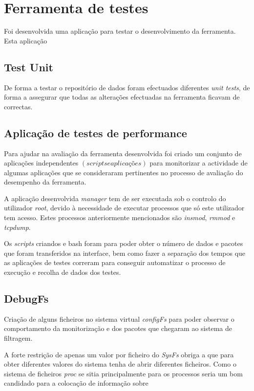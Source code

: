 \section{Ferramenta de testes}

Foi desenvolvida uma aplicação para testar o desenvolvimento da ferramenta.
Esta aplicação 

\subsection{Test Unit}

De forma a testar o repositório de dados foram efectuados diferentes
\textit{unit tests}, de forma a assegurar que todas as alterações efectuadas na
ferramenta ficavam de correctas.

\subsection{Aplicação de testes de performance}

Para ajudar na avaliação da ferramenta desenvolvida foi criado um conjunto de
aplicações independentes $\left( scripts e aplicações \right)$ para monitorizar
a actividade de algumas aplicações que se consideraram pertinentes no processo
de avaliação do desempenho da ferramenta.

A aplicação desenvolvida \textit{manager} tem de ser executada sob o controlo
do utilizador \textit{root}, devido à necessidade de executar processos que só
este utilizador tem acesso. Estes processos anteriormente mencionados são
\textit{insmod}, \textit{rmmod} e \textit{tcpdump}.

Os \textit{scripts} criandos e bash foram para poder obter o número de dados e
pacotes que foram transferidos na interface, bem como fazer a separação dos
tempos que as aplicações de testes correram para conseguir automatizar o
processo de execução e recolha de dados dos testes.

\subsection{DebugFs}

Criação de alguns ficheiros no sistema virtual \textit{configFs} para poder
observar o comportamento da monitorização e dos pacotes que chegaram ao sistema
de filtragem.

A forte restrição de apenas um valor por ficheiro do \textit{SysFs} obriga a
que para obter diferentes valores do sistema tenha de abrir diferentes
ficheiros. Como o sistema de ficheiros \textit{proc} se sitia principalmente
para os processos seria um bom candidado para a colocação de informação sobre 